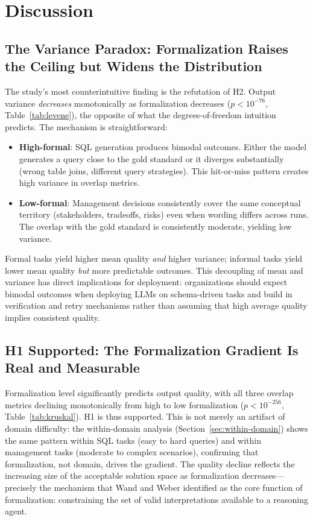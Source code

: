 \documentclass[runningheads]{llncs}
\begin{document}
\section{Discussion}
\label{sec:discussion}

\subsection{The Variance Paradox: Formalization Raises the Ceiling but Widens the Distribution}

The study's most counterintuitive finding is the refutation of H2. Output variance \emph{decreases} monotonically as formalization decreases ($p < 10^{-76}$, Table~\ref{tab:levene}), the opposite of what the degrees-of-freedom intuition predicts. The mechanism is straightforward:

\begin{itemize}[noitemsep]
  \item \textbf{High-formal}: SQL generation produces bimodal outcomes. Either the model generates a query close to the gold standard or it diverges substantially (wrong table joins, different query strategies). This hit-or-miss pattern creates high variance in overlap metrics.
  \item \textbf{Low-formal}: Management decisions consistently cover the same conceptual territory (stakeholders, tradeoffs, risks) even when wording differs across runs. The overlap with the gold standard is consistently moderate, yielding low variance.
\end{itemize}

\noindent Formal tasks yield higher mean quality \emph{and} higher variance; informal tasks yield lower mean quality \emph{but} more predictable outcomes. This decoupling of mean and variance has direct implications for deployment: organizations should expect bimodal outcomes when deploying LLMs on schema-driven tasks and build in verification and retry mechanisms rather than assuming that high average quality implies consistent quality.

\subsection{H1 Supported: The Formalization Gradient Is Real and Measurable}

Formalization level significantly predicts output quality, with all three overlap metrics declining monotonically from high to low formalization ($p < 10^{-256}$, Table~\ref{tab:kruskal}). H1 is thus supported. This is not merely an artifact of domain difficulty: the within-domain analysis (Section~\ref{sec:within-domain}) shows the same pattern within SQL tasks (easy to hard queries) and within management tasks (moderate to complex scenarios), confirming that formalization, not domain, drives the gradient. The quality decline reflects the increasing size of the acceptable solution space as formalization decreases---precisely the mechanism that Wand and Weber \cite{wand1990ontological} identified as the core function of formalization: constraining the set of valid interpretations available to a reasoning agent.
\end{document}
